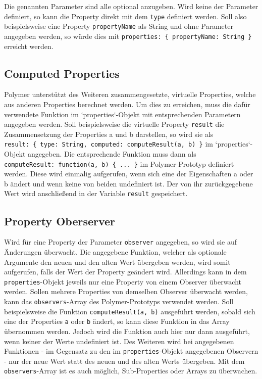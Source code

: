 Die genannten Parameter sind alle optional anzugeben. Wird keine der Parameter definiert, so kann die Property direkt mit dem \texttt{type} definiert werden. Soll also beispielsweise eine Property \texttt{propertyName} als String und ohne Parameter angegeben werden, so würde dies mit \texttt{properties:\ \{\ propertyName:\ String\ \}} erreicht werden.


\subsection{Computed Properties}\label{computed-properties}

Polymer unterstützt des Weiteren zusammengesetzte, virtuelle Properties, welche aus anderen Properties berechnet werden. Um dies zu erreichen, muss die dafür verwendete Funktion im `properties`-Objekt mit entsprechenden Parametern angegeben werden. Soll beispielsweise die virtuelle Property \texttt{result} die Zusammensetzung der Properties a und b darstellen, so wird sie als \texttt{result:\ \{\ type:\ String,\ computed:\ computeResult(a,\ b)\ \}} im `properties`-Objekt angegeben. Die entsprechende Funktion muss dann als \texttt{computeResult:\ function(a,\ b)\ \{\ ...\ \}} im Polymer-Prototyp definiert werden. Diese wird einmalig aufgerufen, wenn sich eine der Eigenschaften a oder b ändert und wenn keine von beiden undefiniert ist. Der von ihr zurückgegebene Wert wird anschließend in der Variable \texttt{result} gespeichert.


\subsection{Property Oberserver}\label{property-oberserver}

Wird für eine Property der Parameter \texttt{observer} angegeben, so wird sie auf Änderungen überwacht. Die angegebene Funktion, welcher als optionale Argumente den neuen und den alten Wert übergeben werden, wird somit aufgerufen, falls der Wert der Property geändert wird. Allerdings kann in dem \texttt{properties}-Objekt jeweils nur eine Property von einem Observer überwacht werden. Sollen mehrere Properties von demselben Observer überwacht werden, kann das \texttt{observers}-Array des Polymer-Prototyps verwendet werden. Soll beispielsweise die Funktion \texttt{computeResult(a,\ b)} ausgeführt werden, sobald sich eine der Properties \texttt{a} oder \texttt{b} ändert, so kann diese Funktion in das Array übernommen werden. Jedoch wird die Funktion auch hier nur dann ausgeführt, wenn keiner der Werte undefiniert ist. Des Weiteren wird bei angegebenen Funktionen - im Gegensatz zu den im \texttt{properties}-Objekt angegebenen Observern - nur der neue Wert statt des neuen und des alten Werts übergeben. Mit dem \texttt{observers}-Array ist es auch möglich, Sub-Properties oder Arrays zu überwachen.

